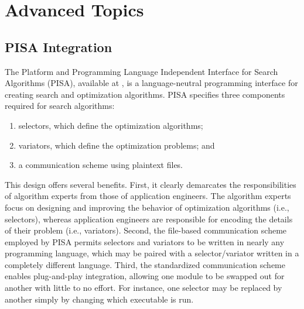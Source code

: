 %
%

\chapter{Advanced Topics}

\section{PISA Integration}
The Platform and Programming Language Independent Interface for Search Algorithms (PISA), available at , is a language-neutral programming interface for creating search and optimization algorithms.  PISA specifies three components required for search algorithms:

\begin{enumerate}
  \item selectors, which define the optimization algorithms;
  \item variators, which define the optimization problems; and
  \item a communication scheme using plaintext files.
\end{enumerate}

This design offers several benefits.  First, it clearly demarcates the responsibilities of algorithm experts from those of application engineers.  The algorithm experts focus on designing and improving the behavior of optimization algorithms (i.e., selectors), whereas application engineers are responsible for encoding the details of their problem (i.e., variators).  Second, the file-based communication scheme employed by PISA permits selectors and variators to be written in nearly any programming language, which may be paired with a selector/variator written in a completely different language.  Third, the standardized communication scheme enables plug-and-play integration, allowing one module to be swapped out for another with little to no effort.  For instance, one selector may be replaced by another simply by changing which executable is run.

